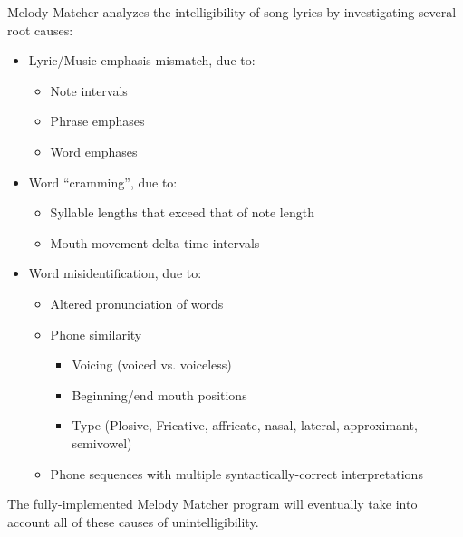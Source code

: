 Melody Matcher analyzes the intelligibility of song lyrics by investigating 
several root causes:


\begin{itemize} 
\item Lyric/Music emphasis mismatch, due to: 

    \begin{itemize} 
    \item Note intervals
    \item Phrase emphases
    \item Word emphases
    \end{itemize} 

\item Word ``cramming'', due to:

    \begin{itemize} 
    \item Syllable lengths that exceed that of note length
    \item Mouth movement delta time intervals
    \end{itemize} 

\item Word misidentification, due to:

    \begin{itemize} 
    \item Altered pronunciation of words
    \item Phone similarity

        \begin{itemize} 
        \item Voicing (voiced vs. voiceless)
        \item Beginning/end mouth positions
        \item Type (Plosive, Fricative, affricate, nasal, lateral, approximant, semivowel)
        \end{itemize} 
    
    \item Phone sequences with multiple syntactically-correct interpretations
    \end{itemize} 
    \end{itemize} 

The fully-implemented Melody Matcher program will eventually take into 
account all of these causes of unintelligibility. 

